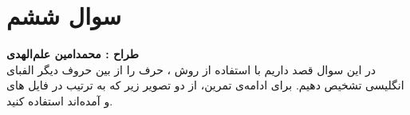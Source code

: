 \documentclass[a4paper]{article}
\begin{document}
\section*{سوال ششم }
\textbf{طراح :‌ محمدامین علم‌الهدی }
\vspace{0.3cm}
\\
در این سوال قصد داریم با استفاده از روش
 ،
 حرف
 را از بین حروف دیگر الفبای انگلیسی تشخیص دهیم. برای ادامه‌ی تمرین، از دو تصویر زیر که به ترتیب در فایل های 
 و
 آمده‌اند استفاده کنید.
\end{document}
